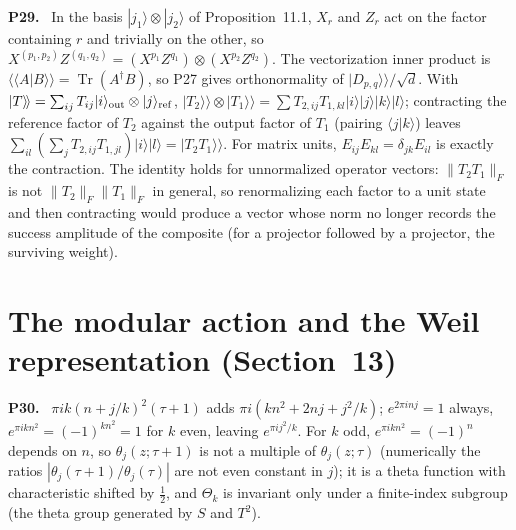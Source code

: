 \documentclass[11pt]{article}
\newcommand{\Tr}{\operatorname{Tr}}
\newenvironment{solution}[1]{\medskip\noindent\textbf{P#1.}\ }{\par\medskip}
\begin{document}
\begin{solution}{29}
In the basis $|j_1\rangle\otimes|j_2\rangle$ of Proposition~11.1, $X_r$ and $Z_r$ act
on the factor containing $r$ and trivially on the other, so
$X^{(p_1,p_2)}Z^{(q_1,q_2)} = (X^{p_1}Z^{q_1})\otimes(X^{p_2}Z^{q_2})$. The
vectorization inner product is $\langle\!\langle A|B\rangle\!\rangle = \Tr(A^\dagger B)$,
so P27 gives orthonormality of $|D_{p,q}\rangle\!\rangle/\sqrt d$.
With $|T\rangle\!\rangle = \sum_{ij}T_{ij}|i\rangle_{\rm out}\otimes|j\rangle_{\rm ref}$,
$|T_2\rangle\!\rangle\otimes|T_1\rangle\!\rangle = \sum T_{2,ij}T_{1,kl}|i\rangle|j\rangle|k\rangle|l\rangle$;
contracting the reference factor of $T_2$ against the output factor of $T_1$
(pairing $\langle j|k\rangle$) leaves $\sum_{il}(\sum_jT_{2,ij}T_{1,jl})|i\rangle|l\rangle = |T_2T_1\rangle\!\rangle$.
For matrix units, $E_{ij}E_{kl} = \delta_{jk}E_{il}$ is exactly the contraction.
The identity holds for unnormalized operator vectors: $\|T_2T_1\|_F$ is not
$\|T_2\|_F\|T_1\|_F$ in general, so renormalizing each factor to a unit state
and then contracting would produce a vector whose norm no longer records the
success amplitude of the composite (for a projector followed by a projector,
the surviving weight).
\end{solution}

\section*{The modular action and the Weil representation (Section~13)}

\begin{solution}{30}
$\pi ik(n+j/k)^2(\tau+1)$ adds $\pi i(kn^2 + 2nj + j^2/k)$; $e^{2\pi inj}=1$
always, $e^{\pi ikn^2} = (-1)^{kn^2} = 1$ for $k$ even, leaving $e^{\pi ij^2/k}$.
For $k$ odd, $e^{\pi ikn^2} = (-1)^n$ depends on $n$, so $\theta_j(z;\tau+1)$ is
not a multiple of $\theta_j(z;\tau)$ (numerically the ratios $|\theta_j(\tau+1)/\theta_j(\tau)|$
are not even constant in $j$); it is a theta function with characteristic
shifted by $\tfrac12$, and $\Theta_k$ is invariant only under a finite-index
subgroup (the theta group generated by $S$ and $T^2$).
\end{solution}
\end{document}
